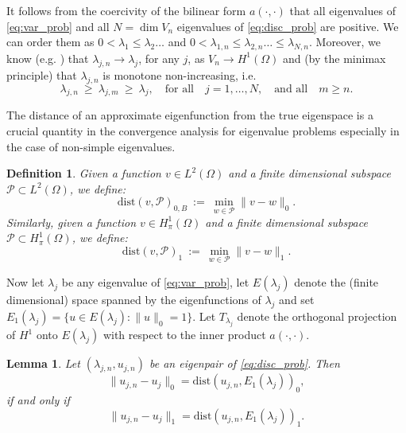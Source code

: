 \documentclass[preprint,12pt]{elsarticle}
\newtheorem{lemma}[theorem]{Lemma}
\newtheorem{definition}[theorem]{Definition}
\newcommand{\cB}{{B}}
\begin{document}
It follows from the coercivity of the bilinear form $a(\cdot,\cdot)$ that
all eigenvalues of  \eqref{eq:var_prob} and all $N=\dim V_n$
eigenvalues of \eqref{eq:disc_prob} are positive.
We can order
them as $0 < \lambda_1 \leq \lambda_2 \ldots $ and $0 < \lambda_{1,n}
\leq \lambda_{2,n} \ldots \leq \lambda_{N,n}$. Moreover, we know (e.g. 
\cite{BaOs:89}) that  $\lambda_{j,n} \rightarrow \lambda_j$,
for any
$j$,  as  $V_n
\rightarrow H^1(\Omega)$ and (by the minimax principle) 
that $\lambda_{j,n}$ is monotone
non-increasing, i.e.
\begin{equation}\label{eq:minimax_shift}
\lambda_{j,n} \ \geq\  \lambda_{j,m}\  \geq\   \lambda_j , \quad
\text{for all} \quad j = 1, \ldots , N, \quad \text{and all} \quad
m \geq n .
\end{equation}

The distance of an approximate eigenfunction from the true eigenspace
is a crucial quantity in the convergence analysis for
eigenvalue problems  especially in the case of non-simple
eigenvalues.

\begin{definition}
\label{def:dist_l2}
Given a function $v\in L^2(\Omega)$ and a finite dimensional subspace $\mathcal{P}\subset L^2(\Omega)$, we define:
$$
\mathrm{dist}(v,\mathcal{P})_{0,\cB}\ :=\ \min_{ w\in\mathcal{P}}  \|v-w\|_{0} .
$$
Similarly, given a function $v\in H^1_\pi(\Omega)$ and a finite dimensional subspace $\mathcal{P}\subset H^1_\pi(\Omega)$, we define:
$$
\mathrm{dist}(v,\mathcal{P})_{1}\ :=\ \min_{ w\in\mathcal{P}}  \|v-w\|_{1} .
$$
\end{definition}

Now let $\lambda_j$ be any eigenvalue of 
\eqref{eq:var_prob},  let $E(\lambda_j)$ denote the (finite
dimensional) space spanned by  the eigenfunctions of  $\lambda_j$ and set
$E_1(\lambda_j)=\{u\in E(\lambda_j):
\|u\|_{0}=1\}$. 
{Let $T_{\lambda_j}$
  denote the orthogonal projection of $H^1$ onto $E(\lambda_j)$ with respect
  to the inner product $a(\cdot, \cdot)$.}

\begin{lemma}\label{lm:inf_l2_h1}
 Let $(\lambda_{j,n},u_{j,n})$ be an eigenpair of \eqref{eq:disc_prob}. Then
\begin{equation}\label{eq:inf_l2_h1_1}
\|u_{j,n}-u_j\|_{0} = \mathrm{dist}(u_{j,n},E_1(\lambda_j))_{0},
\end{equation}
if and only if
\begin{equation}\label{eq:inf_l2_h1_2}
\|{u_{j,n}-u_j}\|_{1}=\mathrm{dist}(u_{j,n},E_1(\lambda_j))_{1}.
\end{equation}

\end{lemma}
\end{document}
